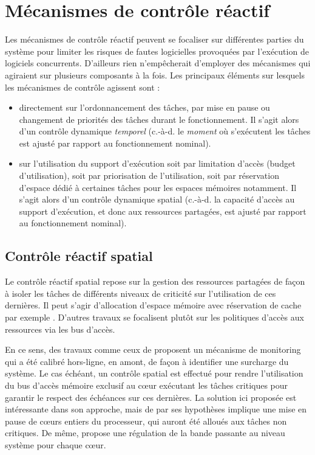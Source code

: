 \documentclass[french, a4paper, 11pt, twoside, pdftex]{StyleThese}
\begin{document}
	\section{Mécanismes de contrôle réactif}
    Les mécanismes de contrôle réactif peuvent se focaliser sur différentes parties du système pour limiter les risques de fautes logicielles provoquées par l'exécution de logiciels concurrents. D'ailleurs rien n'empêcherait d'employer des mécanismes qui agiraient sur plusieurs composants à la fois. Les principaux éléments sur lesquels les mécanismes de contrôle agissent sont : 
     \begin{itemize}
     	\item	directement sur l'ordonnancement des tâches, par mise en pause ou changement de priorités des tâches durant le fonctionnement. Il s'agit alors d'un contrôle dynamique \textit{temporel} (c.-à-d. le \textit{moment} où s'exécutent les tâches est ajusté par rapport au fonctionnement nominal).
     	\item	sur l'utilisation du support d'exécution soit par limitation d'accès (budget d'utilisation), soit par priorisation de l'utilisation, soit par réservation d'espace dédié à certaines tâches pour les espaces mémoires notamment. Il s'agit alors d'un contrôle dynamique spatial (c.-à-d. la capacité d'accès au support d'exécution, et donc aux ressources partagées, est ajusté par rapport au fonctionnement nominal).
     \end{itemize}
 
 	\subsection{Contrôle réactif spatial}
 	Le contrôle réactif spatial repose sur la gestion des ressources partagées de façon à isoler les tâches de différents niveaux de criticité sur l'utilisation de ces dernières. Il peut s'agir d'allocation d'espace mémoire avec réservation de cache par exemple \cite{suhendra_exploring_2008}. D'autres travaux se focalisent plutôt sur les politiques d'accès aux ressources via les bus d'accès.
 	
 	En ce sens, des travaux comme ceux de \cite{blin_maximizing_2016} proposent un mécanisme de monitoring qui a été calibré hors-ligne, en amont, de façon à identifier une surcharge du système. Le cas échéant, un contrôle spatial est effectué  pour rendre l'utilisation du bus d'accès mémoire exclusif au cœur exécutant les tâches critiques pour garantir le respect des échéances sur ces dernières. La solution ici proposée est intéressante dans son approche, mais de par ses hypothèses implique une mise en pause de cœurs entiers du processeur, qui auront été alloués aux tâches non critiques. De même, \cite{yun_memory_2012} propose une régulation de la bande passante au niveau système pour chaque cœur.
 	
\end{document}
